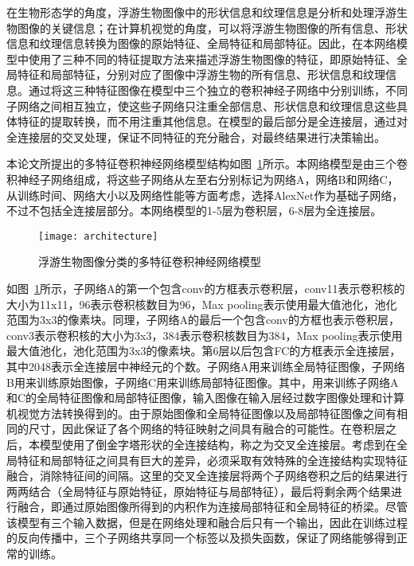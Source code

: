 在生物形态学的角度，浮游生物图像中的形状信息和纹理信息是分析和处理浮游生物图像的关键信息；在计算机视觉的角度，可以将浮游生物图像的所有信息、形状信息和纹理信息转换为图像的原始特征、全局特征和局部特征。因此，在本网络模型中使用了三种不同的特征提取方法来描述浮游生物图像的特征，即原始特征、全局特征和局部特征，分别对应了图像中浮游生物的所有信息、形状信息和纹理信息。通过将这三种特征图像在模型中三个独立的卷积神经子网络中分别训练，不同子网络之间相互独立，使这些子网络只注重全部信息、形状信息和纹理信息这些具体特征的提取转换，而不用注重其他信息。在模型的最后部分是全连接层，通过对全连接层的交叉处理，保证不同特征的充分融合，对最终结果进行决策输出。

本论文所提出的多特征卷积神经网络模型结构如图~\ref{fig:architecture}所示。本网络模型是由三个卷积神经子网络组成，将这些子网络从左至右分别标记为网络A，网络B和网络C，从训练时间、网络大小以及网络性能等方面考虑，选择AlexNet作为基础子网络，不过不包括全连接层部分。本网络模型的1-5层为卷积层，6-8层为全连接层。

\begin{figure}[H] %
  \centering
  \texttt{[image: architecture]}
  \caption{浮游生物图像分类的多特征卷积神经网络模型}
  \label{fig:architecture}
\end{figure}

如图~\ref{fig:architecture}所示，子网络A的第一个包含conv的方框表示卷积层，conv11表示卷积核的大小为11x11，96表示卷积核数目为96，Max pooling表示使用最大值池化，池化范围为3x3的像素块。同理，子网络A的最后一个包含conv的方框也表示卷积层，conv3表示卷积核的大小为3x3，384表示卷积核数目为384，Max pooling表示使用最大值池化，池化范围为3x3的像素块。第6层以后包含FC的方框表示全连接层，其中2048表示全连接层中神经元的个数。子网络A用来训练全局特征图像，子网络B用来训练原始图像，子网络C用来训练局部特征图像。其中，用来训练子网络A和C的全局特征图像和局部特征图像，输入图像在输入层经过数字图像处理和计算机视觉方法转换得到的。由于原始图像和全局特征图像以及局部特征图像之间有相同的尺寸，因此保证了各个网络的特征映射之间具有融合的可能性。在卷积层之后，本模型使用了倒金字塔形状的全连接结构，称之为交叉全连接层。考虑到在全局特征和局部特征之间具有巨大的差异，必须采取有效特殊的全连接结构实现特征融合，消除特征间的间隔。这里的交叉全连接层将两个子网络卷积之后的结果进行两两结合（全局特征与原始特征，原始特征与局部特征），最后将剩余两个结果进行融合，即通过原始图像所得到的内积作为连接局部特征和全局特征的桥梁。尽管该模型有三个输入数据，但是在网络处理和融合后只有一个输出，因此在训练过程的反向传播中，三个子网络共享同一个标签以及损失函数，保证了网络能够得到正常的训练。



